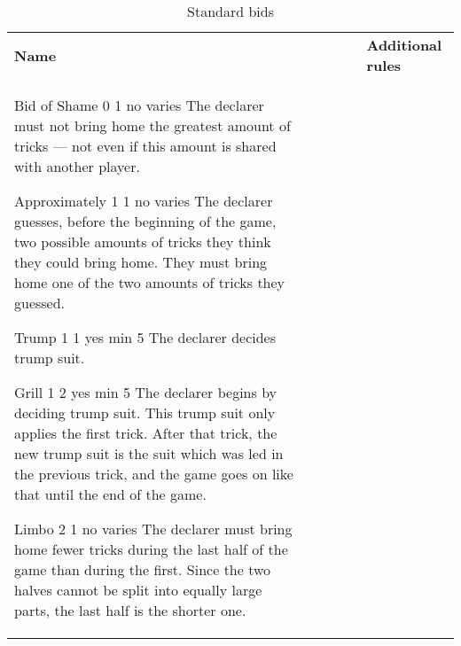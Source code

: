 %
%
%
%

\begin{table}
	\caption{Standard bids}\label{tab:standardBids}
	\begin{center}
		\begin{tabularx}{\textwidth}{
			l
			S[table-number-alignment=center, table-format=1.0]
			S[table-number-alignment=center, table-format=1.0]
			cc|X
		}
				\textbf{Name} &
				 &
				 &
				 &
				 &
				\textbf{Additional rules}
				\\[-3ex]

				\standardBidItem%
				{Bid of Shame}
				{0}
				{1}
				{no}
				{varies}
				{%
					The declarer must not bring home the greatest amount of tricks --- not even if this amount is shared with another player.
				}

				\standardBidItem%
				{Approximately}
				{1}
				{1}
				{no}
				{varies}
				{%
					The declarer guesses, before the beginning of the game, two possible amounts of tricks they think they could bring home. They must bring home one of the two amounts of tricks they guessed.
				}

				\standardBidItem%
				{Trump}
				{1}
				{1}
				{yes}
				{min 5}
				{%
					The declarer decides trump suit.
				}

				\standardBidItem%
				{Grill}
				{1}
				{2}
				{yes}
				{min 5}
				{%
					The declarer begins by deciding trump suit. This trump suit only applies the first trick. After that trick, the new trump suit is the suit which was led in the previous trick, and the game goes on like that until the end of the game.
				}

				\standardBidItem%
				{Limbo}
				{2}
				{1}
				{no}
				{varies}
				{%
					The declarer must bring home fewer tricks during the last half of the game than during the first. Since the two halves cannot be split into equally large parts, the last half is the shorter one.
				}
				

\end{tabularx}
\end{center}
\end{table}
